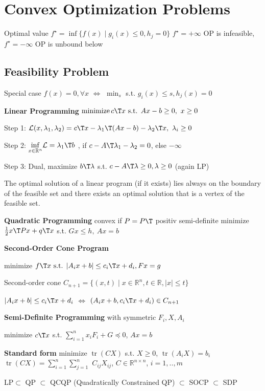 \section{Convex Optimization Problems}

Optimal value $f^\star =
	\operatorname{inf}\{f(x)\mid
	g_i(x)\le0,h_j=0 \}$
$f^\star=+\infty$ OP is infeasible,
$f^\star=-\infty$ OP is unbound below

\subsection{Feasibility  Problem}

Special case $f(x)=0,\forall x$
$\Leftrightarrow$
$\min_s$ s.t. $g_i(x)\le s,h_j(x)=0$

\textbf{Linear Programming}
$ \operatorname{minimize} c\T x
	\text{ s.t. } Ax-b \ge 0,\ x\ge0$

Step 1:
$\mathcal{L}(x,\lambda_1,\lambda_2) =
	c\T x-\lambda_1\T (Ax-b) -\lambda_2\T x,\ \lambda_i \ge0$

Step 2:
$\underset{x \in \mathcal{\mathbb{R}}^n}{\operatorname{inf}}
	\mathcal{L}=\lambda_1\T b$
, if $c-A\T\lambda_1-\lambda_2=0$, else $-\infty$

Step 3: Dual,
maximize $b\T\lambda$
s.t.
$c-A\T\lambda\ge0,\lambda\ge0$
(again LP)

\begin{proposition}
	The optimal solution of a linear program (if it exists)
	lies always on the boundary of the feasible set
	and there exists an optimal solution that is a vertex of the feasible set.
\end{proposition}


\textbf{Quadratic Programming}
convex if $P=P\T$ positiv semi-definite
minimize $\frac{1}{2}x\T Px+q\T x$
s.t. $Gx\le h,\ Ax=b$


\textbf{Second-Order Cone Program}

minimize $f\T x \text{ s.t. }
	|A_ix+b|\le c_i\T x+d_i, Fx=g$

Second-order cone
$C_{n+1}=\{ (x,t)\mid
	x\in\mathbb{R}^{n}, t\in \mathbb{R}, |x|\le t \}$

$|A_ix+b|\le c_i\T x+d_i$
$\Leftrightarrow$
$(A_ix+b, c_i\T x+d_i)\in C_{n+1}$

\textbf{Semi-Definite Programming} with symmetric $F_i,X,A_i$

minimize $c\T x$
s.t.
$\sum_{i=1}^{n}x_iF_i+G\preceq0$,
$Ax=b$

\textbf{Standard form}
minimize $\operatorname{tr}(CX)$
s.t.
$X\ge0$,
$\operatorname{tr}(A_iX)=b_i$
$\operatorname{tr}(CX)=\sum_{i=1}^{n}\sum_{j=1}^{n}$
$C_{ij}X_{ij}$,
$C\in\mathbb{R}^{n\times n}$,
$i=1,..,m$

LP$\subset$ QP $\subset$ QCQP
\scriptsize
(Quadratically Constrained QP)
\footnotesize
$\subset$ SOCP $\subset$ SDP











